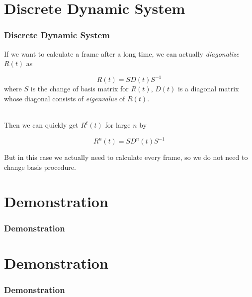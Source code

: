 \documentclass[12pt, t]{beamer}
\renewcommand{\emph}[1]{{\color{Turquoise3}\textsl{#1}}}
\newcommand{\nullspace}{~\\[15pt]}
\begin{document}

\section{Discrete Dynamic System}
\begin{frame}
    \frametitle{Discrete Dynamic System}

    If we want to calculate a frame after a long time, we can actually \emph{diagonalize} $R(t)$
    as

    \begin{equation*}
        R(t) = S D(t) S^{-1}
    \end{equation*}
    where $S$ is the change of basis matrix for $R(t)$, $D(t)$ is a diagonal matrix whose diagonal 
    consists of \emph{eigenvalue} of $R(t)$.

    \nullspace
    Then we can quickly get $R^t(t)$ for large $n$ by
    
    \begin{equation*}
        R^n(t) = SD^n(t)S^{-1}
    \end{equation*}
    
    But in this case we actually need to calculate every frame, 
    so we do not need to change basis procedure.

\end{frame}


\section{Demonstration}
\begin{frame}
    \frametitle{Demonstration}

    \begin{center}
    \end{center}
    

\end{frame}


\section{Demonstration}
\begin{frame}
    \frametitle{Demonstration}

    \begin{center}
    \end{center}

\end{frame}
\end{document}
